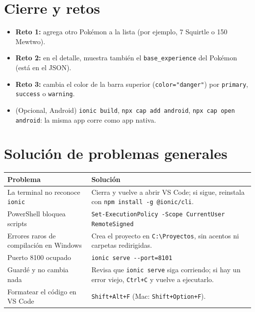 \documentclass[11pt,a4paper]{article}
\newcommand{\cmd}[1]{\texttt{#1}}
\begin{document}
\section{Cierre y retos}
\begin{itemize}
\item \textbf{Reto 1:} agrega otro Pok\'emon a la lista (por ejemplo, 7 Squirtle o 150 Mewtwo).
\item \textbf{Reto 2:} en el detalle, muestra tambi\'en el \texttt{base\_experience} del Pok\'emon (est\'a en el JSON).
\item \textbf{Reto 3:} cambia el color de la barra superior (\texttt{color="danger"}) por \texttt{primary}, \texttt{success} o \texttt{warning}.
\item (Opcional, Android) \cmd{ionic build}, \cmd{npx cap add android}, \cmd{npx cap open android}: la misma app corre como app nativa.
\end{itemize}

\section{Soluci\'on de problemas generales}
\begin{center}
\begin{tabularx}{\linewidth}{@{}>{\raggedright\arraybackslash}p{5.2cm} >{\raggedright\arraybackslash}X@{}}
\toprule\textbf{Problema} & \textbf{Soluci\'on}\\\midrule
La terminal no reconoce \cmd{ionic} & Cierra y vuelve a abrir VS Code; si sigue, reinstala con \cmd{npm install -g @ionic/cli}. \\
PowerShell bloquea scripts & \cmd{Set-ExecutionPolicy -Scope CurrentUser RemoteSigned} \\
Errores raros de compilaci\'on en Windows & Crea el proyecto en \texttt{C:\textbackslash Proyectos}, sin acentos ni carpetas redirigidas. \\
Puerto 8100 ocupado & \cmd{ionic serve -{}-port=8101} \\
Guard\'e y no cambia nada & Revisa que \cmd{ionic serve} siga corriendo; si hay un error viejo, \texttt{Ctrl+C} y vuelve a ejecutarlo. \\
Formatear el c\'odigo en VS Code & \texttt{Shift+Alt+F} (Mac: \texttt{Shift+Option+F}). \\
\bottomrule\end{tabularx}
\end{center}
\end{document}

